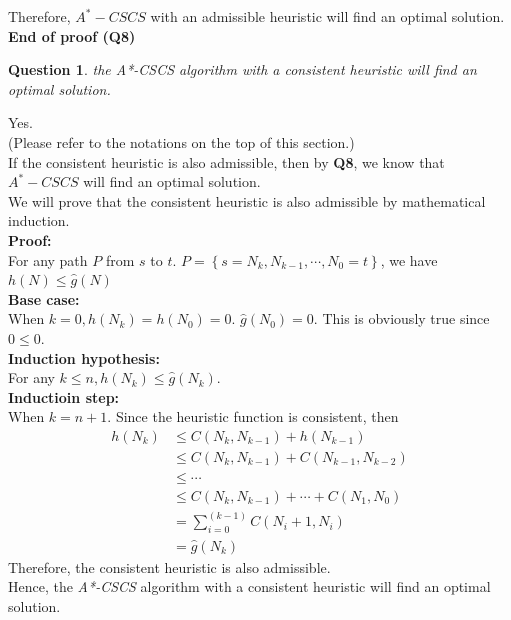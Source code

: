 \documentclass[10.5pt]{article}
\newtheorem{Q}{Question}
\begin{document}
Therefore, $A^*-CSCS$ with an admissible heuristic will find an optimal solution.\\
\textbf{End of proof (Q8)}\\
\pagebreak
\begin{Q}
	the A*-CSCS algorithm with a consistent heuristic will find an optimal solution.
\end{Q}
Yes.\\
(Please refer to the notations on the top of this section.)\\
If the consistent heuristic is also admissible, then by \textbf{Q8}, we know that $A^*-CSCS$ will find an optimal solution.\\
We will prove that the consistent heuristic is also admissible by mathematical induction.\\
\textbf{Proof:}\\
For any path $P$ from $s$ to $t$. $P = \left\{s = N_k, N_{k - 1}, \cdots, N_0 = t\right\}$, we have $h(N) \le \hat g(N)$\\
\textbf{Base case:}\\
When $k = 0, h(N_k) = h(N_0) = 0$. $\hat g(N_0) = 0$. This is obviously true since $0\le 0$.\\
\textbf{Induction hypothesis:}\\
For any \( k \le n , h(N_k) \le \hat g(N_k)\).\\
\textbf{Inductioin step:}\\
When \(k = n + 1\). Since the heuristic function is consistent, then
\begin{align*}
	h(N_k) & \le C(N_k, N_{k-1}) + h(N_{k - 1})              \\
	       & \le C(N_k, N_{k - 1}) + C(N_{k-1}, N_{k - 2})   \\
	       & \le \cdots                                      \\
	       & \le C(N_k, N_{k - 1}) + \cdots +C(N_{1}, N_{0}) \\
	       & = \sum_{i = 0}^{(k - 1)} C(N_i+1, N_i)          \\
	       & = \hat g(N_k)
\end{align*}
Therefore, the consistent heuristic is also admissible.\\
Hence, the \textit{A*-CSCS} algorithm with a consistent heuristic will find an optimal solution.
\pagebreak
\end{document}

